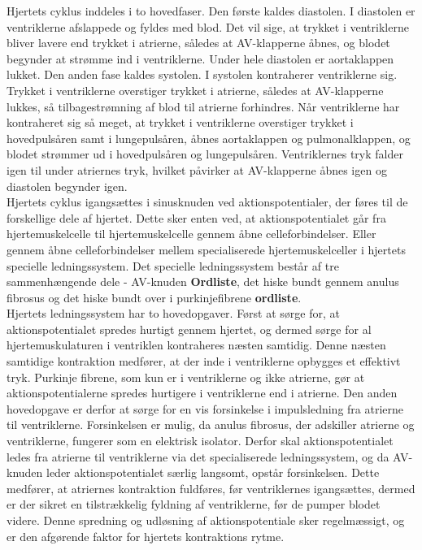 Hjertets cyklus inddeles i to hovedfaser. Den første kaldes diastolen. I diastolen er ventriklerne afslappede og fyldes med blod. Det vil sige, at trykket i ventriklerne bliver lavere end trykket i atrierne, således at AV-klapperne åbnes, og blodet begynder at strømme ind i ventriklerne. Under hele diastolen er aortaklappen lukket. Den anden fase kaldes systolen. I systolen kontraherer ventriklerne sig. Trykket i ventriklerne overstiger trykket i atrierne, således at AV-klapperne lukkes, så tilbagestrømning af blod til atrierne forhindres. Når ventriklerne har kontraheret sig så meget, at trykket i ventriklerne overstiger trykket i hovedpulsåren samt i lungepulsåren, åbnes aortaklappen og pulmonalklappen, og blodet strømmer ud i hovedpulsåren og lungepulsåren. Ventriklernes tryk falder igen til under atriernes tryk, hvilket påvirker at AV-klapperne åbnes igen og diastolen begynder igen.\\
Hjertets cyklus igangsættes i sinusknuden ved aktionspotentialer, der føres til de forskellige dele af hjertet. Dette sker enten ved, at aktionspotentialet går fra hjertemuskelcelle til hjertemuskelcelle gennem åbne celleforbindelser. Eller gennem åbne celleforbindelser mellem specialiserede hjertemuskelceller i hjertets specielle ledningssystem. Det specielle ledningssystem består af tre sammenhængende dele - AV-knuden \textbf{ Ordliste}, det hiske bundt gennem anulus fibrosus og det hiske bundt over i purkinjefibrene \textbf{ ordliste}. \\
Hjertets ledningssystem har to hovedopgaver. Først at sørge for, at aktionspotentialet spredes hurtigt gennem hjertet, og dermed sørge for al hjertemuskulaturen i ventriklen kontraheres næsten samtidig. Denne næsten samtidige kontraktion medfører, at der inde i ventriklerne opbygges et effektivt tryk. Purkinje fibrene, som kun er i ventriklerne og ikke atrierne, gør at aktionspotentialerne spredes hurtigere i ventriklerne end i atrierne. Den anden hovedopgave er derfor at sørge for en vis forsinkelse i impulsledning fra atrierne til ventriklerne. Forsinkelsen er mulig, da anulus fibrosus, der adskiller atrierne og ventriklerne, fungerer som en elektrisk isolator. Derfor skal aktionspotentialet ledes fra atrierne til ventriklerne via det specialiserede ledningssystem, og da AV-knuden leder aktionspotentialet særlig langsomt, opstår forsinkelsen. Dette medfører, at atriernes kontraktion fuldføres, før ventriklernes igangsættes, dermed er der sikret en tilstrækkelig fyldning af ventriklerne, før de pumper blodet videre. Denne spredning og udløsning af aktionspotentiale sker regelmæssigt, og er den afgørende faktor for hjertets kontraktions rytme.
